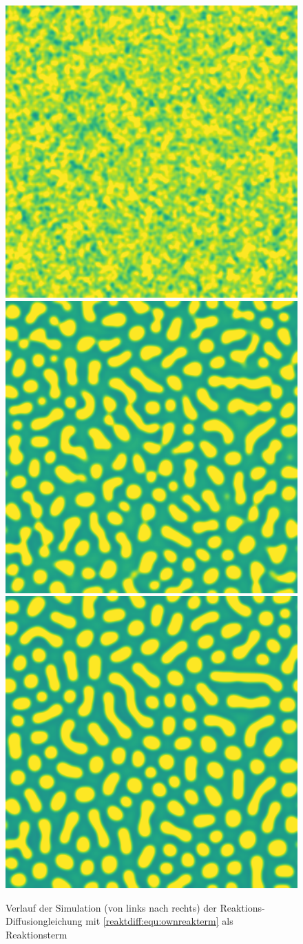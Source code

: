 \begin{figure}
    \centering
    \includegraphics[width=0.32\linewidth]{papers/reaktdiff/images/simpleExample/easy_n1.png}
    \includegraphics[width=0.32\linewidth]{papers/reaktdiff/images/simpleExample/easy_n300.png}
    \includegraphics[width=0.32\linewidth]{papers/reaktdiff/images/simpleExample/easy_n999.png}
    \caption{Verlauf der Simulation (von links nach rechts) der Reaktions-Diffusiongleichung mit \eqref{reaktdiff:equ:ownreakterm} als Reaktionsterm}
    \label{reaktdiff:fig:ownreakterm}
\end{figure}
